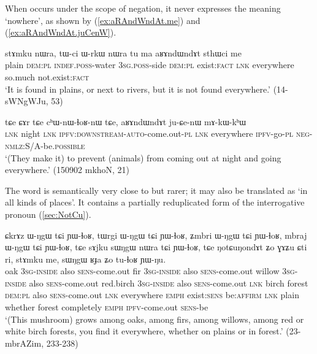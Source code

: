 When  occurs under the scope of negation, it never expresses the meaning `nowhere', as shown by (\ref{ex:aRAndWndAt.me}) and (\ref{ex:aRAndWndAt.juCenW}).

\begin{exe}
\ex \label{ex:aRAndWndAt.me}
\gll stɤmku nɯra, tɯ-ci ɯ-rkɯ nɯra tu ma aʁɤndɯndɤt sthɯci me \\
plain \textsc{dem:pl} \textsc{indef.poss}-water \textsc{3sg.poss}-side  \textsc{dem:pl} exist:\textsc{fact} \textsc{lnk} everywhere so.much not.exist:\textsc{fact} \\
\glt `It is found in plains, or next to rivers, but it is not found everywhere.' (14-sWNgWJu, 53)
\end{exe} 

\begin{exe}
\ex \label{ex:aRAndWndAt.juCenW}
\gll tɕe ɕɤr tɕe cʰɯ-nɯ-ɬoʁ-nɯ tɕe, aʁɤndɯndɤt ju-ɕe-nɯ mɤ-kɯ-kʰɯ \\
\textsc{lnk} night \textsc{lnk} \textsc{ipfv:downstream-auto}-come.out-\textsc{pl} \textsc{lnk} everywhere \textsc{ipfv}-go-\textsc{pl} \textsc{neg}-\textsc{nmlz}:S/A-be.\textsc{possible} \\
\glt `(They make it) to prevent (animals) from coming out at night and going everywhere.' (150902 mkhoN, 21)
\end{exe} 

The word   is semantically very close to  but rarer; it may also be translated as `in all kinds of places'. It contains a partially reduplicated form of the interrogative pronoun  (\ref{sec:NotCu}).

 \begin{exe}
\ex \label{ex:NotCuNondAt}
\gll ɕkrɤz ɯ-ŋgɯ tɕi ɲɯ-ɬoʁ, tɯrgi ɯ-ŋgɯ tɕi ɲɯ-ɬoʁ, ʑmbri ɯ-ŋgɯ tɕi ɲɯ-ɬoʁ,  mbraj ɯ-ŋgɯ tɕi ɲɯ-ɬoʁ, tɕe sɤjku sɯŋgɯ nɯra tɕi ɲɯ-ɬoʁ, tɕe ŋotɕuŋondɤt ʑo ɣɤʑu ɕti ri, stɤmku me, sɯŋgɯ ʁɟa ʑo tu-ɬoʁ ɲɯ-ŋu. \\
oak \textsc{3sg-inside} also \textsc{sens}-come.out fir \textsc{3sg-inside} also \textsc{sens}-come.out willow \textsc{3sg-inside} also \textsc{sens}-come.out red.birch \textsc{3sg-inside} also \textsc{sens}-come.out \textsc{lnk} birch  forest \textsc{dem:pl} also \textsc{sens}-come.out \textsc{lnk} everywhere \textsc{emph} exist:\textsc{sens} be:\textsc{affirm}  \textsc{lnk} plain whether  forest completely \textsc{emph} \textsc{ipfv}-come.out \textsc{sens}-be \\
\glt `(This mushroom) grows among oaks, among firs, among willows, among red or white birch forests, you find it everywhere, whether on plains or in forest.' (23-mbrAZim, 233-238)
\end{exe} 

